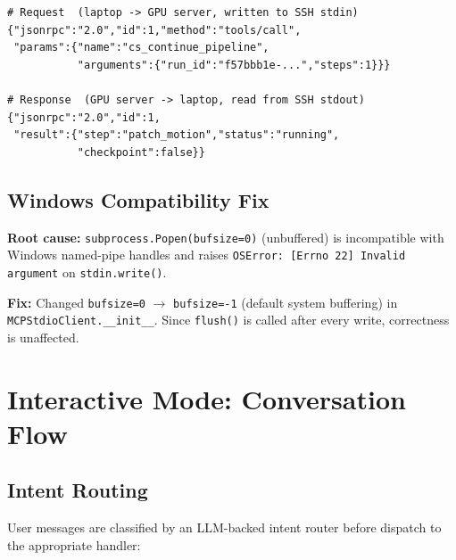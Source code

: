 \documentclass[12pt, a4paper]{article}
\begin{document}
\begin{lstlisting}[caption={JSONL framing --- request and response},
  label=lst:jsonl]
# Request  (laptop -> GPU server, written to SSH stdin)
{"jsonrpc":"2.0","id":1,"method":"tools/call",
 "params":{"name":"cs_continue_pipeline",
           "arguments":{"run_id":"f57bbb1e-...","steps":1}}}

# Response  (GPU server -> laptop, read from SSH stdout)
{"jsonrpc":"2.0","id":1,
 "result":{"step":"patch_motion","status":"running",
           "checkpoint":false}}
\end{lstlisting}

\subsection{Windows Compatibility Fix}

\begin{tcolorbox}[
  colback=red!5, colframe=codered, arc=4pt, boxrule=0.8pt,
  title={\small\bfseries Bug fixed: OSError on Windows --- \texttt{bufsize=0}}
]
\small
\textbf{Root cause:}
\texttt{subprocess.Popen(bufsize=0)} (unbuffered) is incompatible with
Windows named-pipe handles and raises
\texttt{OSError: [Errno 22] Invalid argument} on \texttt{stdin.write()}.

\medskip
\textbf{Fix:}
Changed \texttt{bufsize=0} $\to$ \texttt{bufsize=-1} (default system
buffering) in \texttt{MCPStdioClient.\_\_init\_\_}.
Since \texttt{flush()} is called after every write, correctness is
unaffected.
\end{tcolorbox}

\section{Interactive Mode: Conversation Flow}
\label{sec:interactive}

\subsection{Intent Routing}

User messages are classified by an LLM-backed intent router before dispatch
to the appropriate handler:
\end{document}
